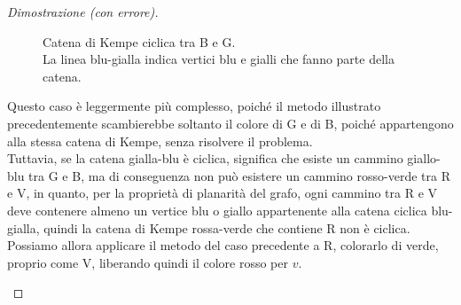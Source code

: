 \documentclass[a4paper,12pt,titlepage]{report}
\begin{document}
\begin{proof}[Dimostrazione (con errore)]
\begin{enumerate}
\begin{description}
\begin{figure}[h]
        			\vspace{0.5cm}
        			\caption{Catena di Kempe ciclica tra B e G.
        				\\La linea blu-gialla indica vertici blu e gialli che fanno parte della catena.}
        		\end{figure}
        		Questo caso è leggermente più complesso, poiché il metodo illustrato precedentemente scambierebbe soltanto il colore di G e di B, poiché appartengono alla stessa catena di Kempe, senza risolvere il problema.
        		\\Tuttavia, se la catena gialla-blu è ciclica, significa che esiste un cammino giallo-blu tra G e B, ma di conseguenza non può esistere un cammino rosso-verde tra R e V, in quanto, per la proprietà di planarità del grafo, ogni cammino tra R e V deve contenere almeno un vertice blu o giallo appartenente alla catena ciclica blu-gialla, quindi la catena di Kempe rossa-verde che contiene R non è ciclica.
        		\\Possiamo allora applicare il metodo del caso precedente a R, colorarlo di verde, proprio come V, liberando quindi il colore rosso per $v$.
        		\begin{figure}[h]
        			\centering
\end{figure}
\end{description}
\end{enumerate}
\end{proof}
\end{document}
